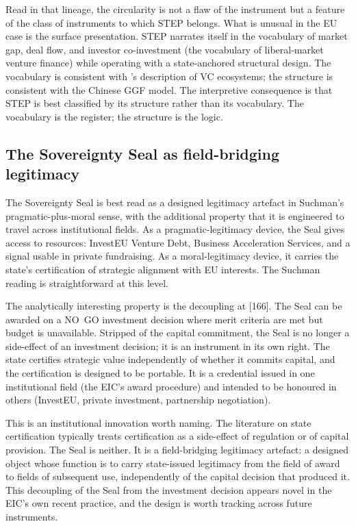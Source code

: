 Read in that lineage, the circularity is not a flaw of the instrument
but a feature of the class of instruments to which STEP belongs. What
is unusual in the EU case is the surface presentation. STEP narrates
itself in the vocabulary of market gap, deal flow, and investor
co-investment (the vocabulary of liberal-market venture finance) while
operating with a state-anchored structural design. The vocabulary is
consistent with \textcite{ferrary2009vc}'s description of VC
ecosystems; the structure is consistent with the Chinese GGF model.
The interpretive consequence is that STEP is best classified by its
structure rather than its vocabulary. The vocabulary is the register;
the structure is the logic.

\subsection{The Sovereignty Seal as field-bridging legitimacy}
\label{sec:disc-step-seal}

The Sovereignty Seal is best read as a designed legitimacy artefact in
Suchman's pragmatic-plus-moral sense, with the additional property
that it is engineered to travel across institutional fields. As a
pragmatic-legitimacy device, the Seal gives access to resources:
InvestEU Venture Debt, Business Acceleration Services, and a signal
usable in private fundraising. As a moral-legitimacy device, it
carries the state's certification of strategic alignment with EU
interests. The Suchman reading is straightforward at this level.

The analytically interesting property is the decoupling at [166]. The
Seal can be awarded on a NO~GO investment decision where merit
criteria are met but budget is unavailable. Stripped of the capital
commitment, the Seal is no longer a side-effect of an investment
decision; it is an instrument in its own right. The state certifies
strategic value independently of whether it commits capital, and the
certification is designed to be portable. It is a credential issued in
one institutional field (the EIC's award procedure) and intended to be
honoured in others (InvestEU, private investment, partnership
negotiation).

This is an institutional innovation worth naming. The literature on
state certification typically treats certification as a side-effect of
regulation or of capital provision. The Seal is neither. It is a
field-bridging legitimacy artefact: a designed object whose function
is to carry state-issued legitimacy from the field of award to fields
of subsequent use, independently of the capital decision that produced
it. This decoupling of the Seal from the investment decision appears
novel in the EIC's own recent practice, and the design is worth
tracking across future instruments.

